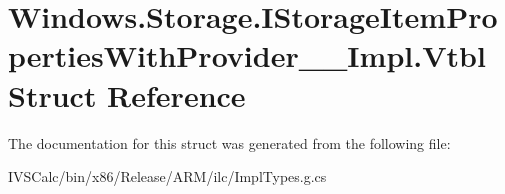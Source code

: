 \hypertarget{struct_windows_1_1_storage_1_1_i_storage_item_properties_with_provider_____impl_1_1_vtbl}{}\section{Windows.\+Storage.\+I\+Storage\+Item\+Properties\+With\+Provider\+\_\+\+\_\+\+Impl.\+Vtbl Struct Reference}
\label{struct_windows_1_1_storage_1_1_i_storage_item_properties_with_provider_____impl_1_1_vtbl}


The documentation for this struct was generated from the following file\+:\begin{DoxyCompactItemize}
\item 
I\+V\+S\+Calc/bin/x86/\+Release/\+A\+R\+M/ilc/Impl\+Types.\+g.\+cs\end{DoxyCompactItemize}
